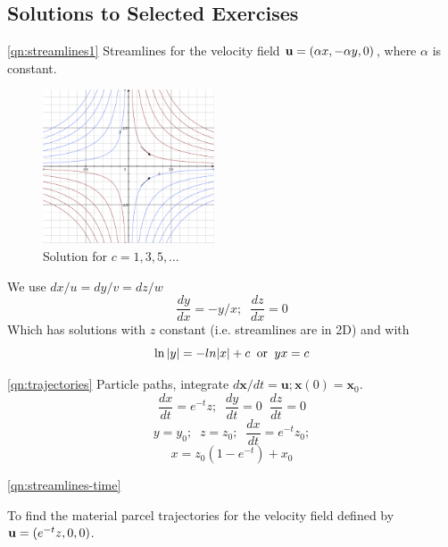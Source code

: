 \documentclass[10pt]{report}
\begin{document}
\divider
\pagebreak



\begin{answer1}

\section{Solutions to Selected Exercises}

\begin{questionnumber}{\ref{qn:streamlines1}}
Streamlines for the velocity field ${{\bf u}}=(\alpha x,-\alpha y,0)$,
where $\alpha $ is constant.

	\begin{figure}
		\includegraphics[width=2.0in]{ExercisesCh1-Q1-plot}
		\caption*{ Solution for $c=1, 3, 5, \ldots $ }
	\end{figure}

	We use ${dx}/{u} = {dy}/{v} = {dz}/{w}$
	\[
	 \frac{dy}{dx} = -y/x; \;\; \frac{dz}{dx}=0
	\]
	Which has solutions with $z$ constant (i.e. streamlines are in 2D) and with
	\[
	 \ln |y| = -ln |x| + c \;\; \mbox{\rm or} \;\; yx = c
	\]

\end{questionnumber}

\begin{questionnumber}{\ref{qn:trajectories}}
	Particle paths, integrate $d{\bm x}/dt = {\bm u}; {\bm x}(0) = {\bm x}_{0}$.
	\[
	 \frac{dx}{dt} = e^{-t}z; \;\; \frac{dy}{dt}=0 \;\; \frac{dz}{dt}=0
	\]
	\[
	 y=y_{0}; \;\; z=z_{0}; \;\;  \frac{dx}{dt} = e^{-t}z_{0};
	\]
	\[
	x = z_{0}(1-e^{-t}) + x_{0}
	\]
\end{questionnumber}


\begin{questionnumber}{\ref{qn:streamlines-time}}

To find the material parcel trajectories for the velocity field defined by ${{\bf u}}=(e^{-t}z,0,0)$.


\end{questionnumber}
\end{answer1}
\end{document}
